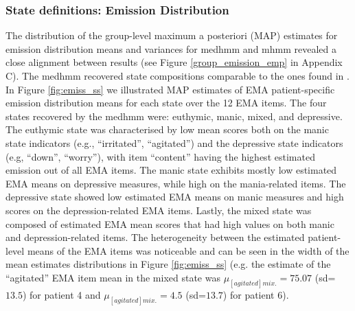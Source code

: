 \subsubsection*{State definitions: Emission Distribution}
The distribution of the group-level maximum a posteriori (MAP) estimates for emission distribution means and variances for \ac{medhmm} and \ac{mhmm} revealed a close alignment between  results (see Figure \ref{group_emission_emp} in Appendix C). The \ac{medhmm} recovered state compositions comparable to the ones found in \cite{mildiner_moraga_bos_doornbos_bruggeman_van_2023}. In Figure \ref{fig:emiss_ss} we illustrated  MAP estimates of EMA patient-specific emission distribution means for each state over the 12 EMA items. The four states recovered by the \ac{medhmm} were: euthymic, manic, mixed, and depressive. The euthymic state was characterised by low mean scores both on the manic state indicators (e.g., “irritated”, “agitated”) and the depressive state indicators (e.g, “down”, “worry”), with item “content” having the highest estimated emission out of all EMA items. The manic state exhibits mostly low estimated EMA means on depressive measures, while high on the mania-related items. The depressive state showed low estimated EMA means on manic measures and high scores on the depression-related EMA items. Lastly, the mixed state was composed of estimated EMA mean scores that had high values on both manic and depression-related items. The heterogeneity between the estimated patient-level means of the EMA items was noticeable and can be seen in the width of the mean estimates distributions in Figure \ref{fig:emiss_ss} (e.g. the estimate of the “agitated” EMA item mean in the mixed state was ${\mu}_{[agitated]mix.}=75.07$ (sd=$13.5$) for patient 4 and ${\mu}_{[agitated]mix.}=4.5$ (sd=$13.7$) for patient 6). 

